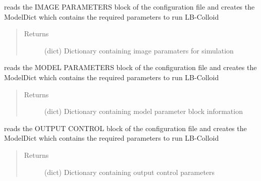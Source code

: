 \documentclass[letterpaper,10pt,english]{sphinxmanual}
\begin{document}
\begin{fulllineitems}
\begin{fulllineitems}
\label{\detokenize{index:lb_colloids.LB.LBIO.Config.image_parameters}}
reads the IMAGE PARAMETERS block of the configuration file and creates
the ModelDict which contains the required parameters to run LB-Colloid
\begin{quote}\begin{description}
\item[{Returns}] \leavevmode
(dict) Dictionary containing image paramaters for simulation

\end{description}\end{quote}

\end{fulllineitems}


\begin{fulllineitems}
\label{\detokenize{index:lb_colloids.LB.LBIO.Config.model_parameters}}
reads the MODEL PARAMETERS block of the configuration file and creates
the ModelDict which contains the required parameters to run LB-Colloid
\begin{quote}\begin{description}
\item[{Returns}] \leavevmode
(dict) Dictionary containing model parameter block information

\end{description}\end{quote}

\end{fulllineitems}


\begin{fulllineitems}
\label{\detokenize{index:lb_colloids.LB.LBIO.Config.output_parameters}}
reads the OUTPUT CONTROL block of the configuration file and creates
the ModelDict which contains the required parameters to run LB-Colloid
\begin{quote}\begin{description}
\item[{Returns}] \leavevmode
(dict) Dictionary containing output control parameters


\end{description}
\end{quote}
\end{fulllineitems}
\end{fulllineitems}
\end{document}

